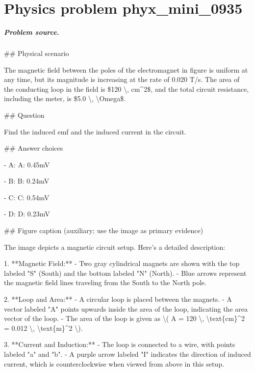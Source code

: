 
\chapter{Physics problem phyx\_mini\_0935}
\label{ch:PhyXMiniProblems_problem_phyx_mini_0935}

\paragraph{Problem source.}
\#\# Physical scenario

The magnetic field between the poles of the electromagnet in figure is uniform at any time, but its magnitude is increasing at the rate of 0.020 T/s. The area of the conducting loop in the field is \$120 \textbackslash{}, cm\textasciicircum{}2\$, and the total circuit resistance, including the meter, is \$5.0 \textbackslash{}, \textbackslash{}Omega\$.

\#\# Question

Find the induced emf and the induced current in the circuit.

\#\# Answer choices

- A: A: 0.45mV

- B: B: 0.24mV

- C: C: 0.54mV

- D: D: 0.23mV

\#\# Figure caption (auxiliary; use the image as primary evidence)

The image depicts a magnetic circuit setup. Here's a detailed description:

1. **Magnetic Field:**
   - Two gray cylindrical magnets are shown with the top labeled "S" (South) and the bottom labeled "N" (North). 
   - Blue arrows represent the magnetic field lines traveling from the South to the North pole.

2. **Loop and Area:**
   - A circular loop is placed between the magnets.
   - A vector labeled "A" points upwards inside the area of the loop, indicating the area vector of the loop.
   - The area of the loop is given as \textbackslash{}( A = 120 \textbackslash{}, \textbackslash{}text\{cm\}\textasciicircum{}2 = 0.012 \textbackslash{}, \textbackslash{}text\{m\}\textasciicircum{}2 \textbackslash{}).

3. **Current and Induction:**
   - The loop is connected to a wire, with points labeled "a" and "b".
   - A purple arrow labeled "I" indicates the direction of induced current, which is counterclockwise when viewed from above in this setup.


